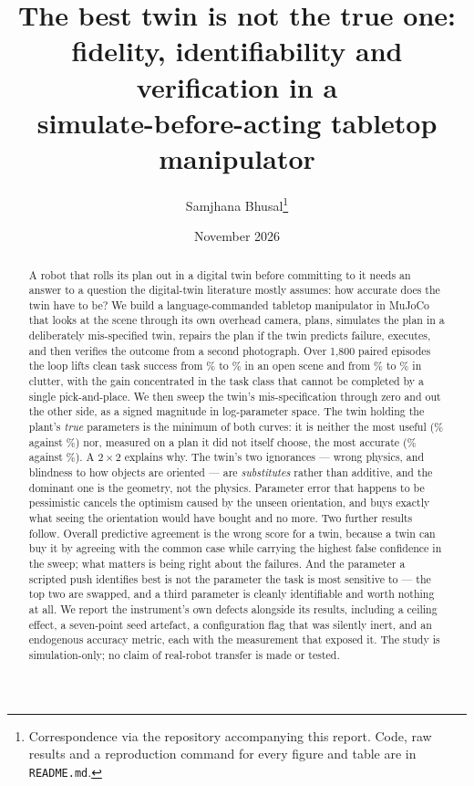 \documentclass[11pt,a4paper]{article}
\title{\bfseries The best twin is not the true one:\\[2pt]
       \large fidelity, identifiability and verification in a\\
       simulate-before-acting tabletop manipulator}
\author{Samjhana Bhusal\thanks{Correspondence via the repository accompanying
this report. Code, raw results and a reproduction command for every figure and
table are in \texttt{README.md}.}}
\date{November 2026}
\begin{document}
\maketitle

\begin{abstract}
\noindent
A robot that rolls its plan out in a digital twin before committing to it needs
an answer to a question the digital-twin literature mostly assumes: how accurate
does the twin have to be? We build a language-commanded tabletop manipulator in
MuJoCo that looks at the scene through its own overhead camera, plans, simulates
the plan in a deliberately mis-specified twin, repairs the plan if the twin
predicts failure, executes, and then verifies the outcome from a second
photograph. Over 1{,}800 paired episodes the loop lifts clean task success from
\numDirectOpenClean\% to \numLoopOpenClean\% in an open scene and from
\numDirectClutClean\% to \numLoopClutClean\% in clutter, with the gain
concentrated in the task class that cannot be completed by a single
pick-and-place. We then sweep the twin's mis-specification through zero and out
the other side, as a signed magnitude in log-parameter space. The twin holding
the plant's \emph{true} parameters is the minimum of both curves: it is neither
the most useful (\numSweepZero\% against \numSweepPlusOne\%) nor, measured on a
plan it did not itself choose, the most accurate (\numSweepZeroAcc\% against
\numSweepPlusTwoAcc\%). A $2\times2$ explains why. The twin's two ignorances ---
wrong physics, and blindness to how objects are oriented --- are
\emph{substitutes} rather than additive, and the dominant one is the geometry,
not the physics. Parameter error that happens to be pessimistic cancels the
optimism caused by the unseen orientation, and buys exactly what seeing the
orientation would have bought and no more. Two further results follow. Overall
predictive agreement is the wrong score for a twin, because a twin can buy it by
agreeing with the common case while carrying the highest false confidence in the
sweep; what matters is being right about the failures. And the parameter a
scripted push identifies best is not the parameter the task is most sensitive to
--- the top two are swapped, and a third parameter is cleanly identifiable and
worth nothing at all. We report the instrument's own defects alongside its
results, including a ceiling effect, a seven-point seed artefact, a
configuration flag that was silently inert, and an endogenous accuracy metric,
each with the measurement that exposed it. The study is simulation-only; no
claim of real-robot transfer is made or tested.
\end{abstract}
\end{document}
